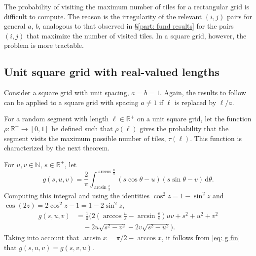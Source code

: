 \documentclass[12pt, a4paper]{article}
\newcommand{\diff}{\mathrm d}
\newcommand{\funt}{\tau} %
\newcommand{\probmax}{\rho} %
\newcommand{\len}{\ell} %
\newcommand{\genvar}{s}
\begin{document}
The probability of visiting the maximum number of tiles for a rectangular grid is difficult to compute. The reason is the irregularity of the relevant $(i,j)$ pairs for general $a$, $b$, analogous to that observed in \S\ref{part: fund results} for the pairs $(i,j)$ that maximize the number of visited tiles. In a square grid, however, the problem is more tractable.


\subsection{Unit square grid with real-valued lengths}
\label{part: probmax: unit square grid, real lengths}

Consider a square grid with unit spacing, $a=b=1$. Again, the results to follow can be applied to a square grid with spacing $a \neq 1$ if $\len$ is replaced by $\len/a$.

For a random segment with length $\len \in \mathbb R^+$ on a unit square grid, let the function $\probmax: \mathbb R^+ \to [0,1]$ be defined such that $\probmax(\len)$ gives the probability that the segment visits the maximum possible number of tiles, $\funt(\len)$. This function is characterized by the next theorem.

For $u, v \in \mathbb N$, $\genvar \in \mathbb R^+$, let
\begin{equation}
\label{eq: g def}
g(\genvar, u, v) = \frac 2 \pi \int_{\arcsin \frac v {\genvar}}^{\arccos \frac u {\genvar}} \left( \genvar \cos \theta - u \right) \left( \genvar \sin \theta - v \right) \, \diff \theta.
\end{equation}
Computing this integral and using the identities $\cos^2 z = 1-\sin^2 z$ and $\cos(2z) = 2\cos^2z-1 = 1 - 2\sin^2z$,
\begin{equation}
\label{eq: g fin}
\begin{split}
g(\genvar, u, v) &= \frac 1 {\pi} \biggl(
2\left(\arccos\frac{u}{\genvar}-\arcsin\frac{v}{\genvar}\right) u v + \genvar^2 + u^2 + v^2 \\
& \quad - 2 u \sqrt{\genvar^2-v^2} - 2 v \sqrt{\genvar^2-u^2} \biggr).
\end{split}
\end{equation}
Taking into account that $\arcsin x = \pi/2 - \arccos x$, it follows from \eqref{eq: g fin} that $g(\genvar, u, v) = g(\genvar, v, u)$.
\end{document}
